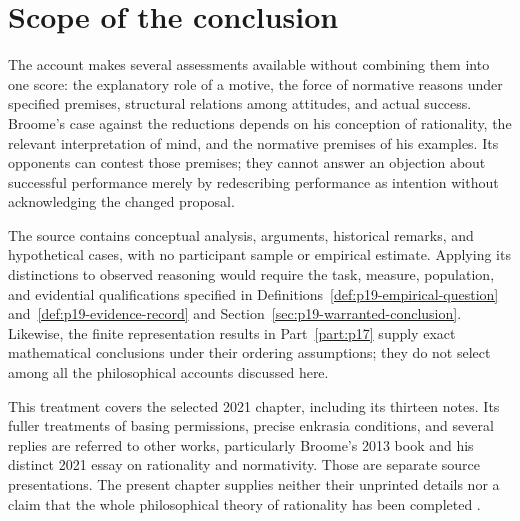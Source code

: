 \section{Scope of the conclusion}
\label{sec:p11-reasons-boundary}

The account makes several assessments available without combining them into
one score: the explanatory role of a motive, the force of normative reasons
under specified premises, structural relations among attitudes, and actual
success. Broome's case against the reductions depends on his conception of
rationality, the relevant interpretation of mind, and the normative premises
of his examples. Its opponents can contest those premises; they cannot
answer an objection about successful performance merely by redescribing
performance as intention without acknowledging the changed proposal.

The source contains conceptual analysis, arguments, historical remarks,
and hypothetical cases, with no participant sample or empirical estimate.
Applying its distinctions to observed reasoning would require the task,
measure, population, and evidential qualifications specified in
Definitions~\ref{def:p19-empirical-question} and~\ref{def:p19-evidence-record}
and Section~\ref{sec:p19-warranted-conclusion}. Likewise, the finite
representation results in Part~\ref{part:p17} supply exact mathematical conclusions
under their ordering assumptions; they do not select among all the
philosophical accounts discussed here.

This treatment covers the selected 2021 chapter, including its thirteen
notes. Its fuller treatments of basing permissions, precise enkrasia
conditions, and several replies are referred to other works, particularly
Broome's 2013 book and his distinct 2021 essay on rationality and normativity.
Those are separate source presentations. The present chapter supplies
neither their unprinted details nor a claim that the whole philosophical
theory of rationality has been completed
\parencite[pp.~135--136]{Broome2021ReasonsRationality}.
